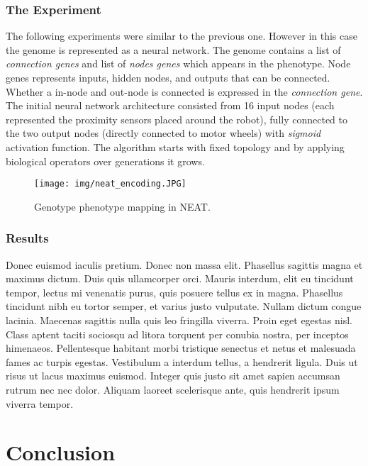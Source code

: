 \documentclass[format=acmsmall, review=false, screen=true]{acmart}
\begin{document}
\subsubsection{The Experiment}

The following experiments were similar to the previous one. However in this case the genome is represented as a neural network. The genome contains a list of \emph{connection genes} and list of \emph{nodes genes} which appears in the phenotype. Node genes represents inputs, hidden nodes, and outputs that can be connected. Whether a in-node and out-node is connected is expressed in the \emph{connection gene}. The initial neural network architecture consisted from 16 input nodes (each represented the proximity sensors placed around the robot), fully connected to the two output nodes (directly connected to motor wheels) with \emph{sigmoid} activation function. The algorithm starts with fixed topology and by applying biological operators over generations it grows. 

\begin{figure}[H]
  \texttt{[image: img/neat\_encoding.JPG]}
  \caption{Genotype phenotype mapping in NEAT.}
  \label{fig:encoding}
\end{figure}

\subsubsection{Results}

Donec euismod iaculis pretium. Donec non massa elit. Phasellus sagittis magna et maximus dictum. Duis quis ullamcorper orci. Mauris interdum, elit eu tincidunt tempor, lectus mi venenatis purus, quis posuere tellus ex in magna. Phasellus tincidunt nibh eu tortor semper, et varius justo vulputate. Nullam dictum congue lacinia. Maecenas sagittis nulla quis leo fringilla viverra. Proin eget egestas nisl. Class aptent taciti sociosqu ad litora torquent per conubia nostra, per inceptos himenaeos. Pellentesque habitant morbi tristique senectus et netus et malesuada fames ac turpis egestas. Vestibulum a interdum tellus, a hendrerit ligula. Duis ut risus ut lacus maximus euismod. Integer quis justo sit amet sapien accumsan rutrum nec nec dolor. Aliquam laoreet scelerisque ante, quis hendrerit ipsum viverra tempor.

\section{Conclusion}
\end{document}
